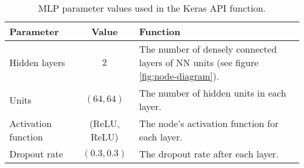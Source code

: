 \begin{table}[!htb]
    \centering
    \caption{\ac{MLP} parameter values used in the Keras API function.}
    \begin{tabular}{>{\raggedright}p{} | c | p{}}
        Parameter                       & Value                     & Function \\ \hline
        Hidden layers                   & $2$                       & The number of densely connected layers of \ac{NN} units (see figure \ref{fig:node-diagram}). \\ \hline
        Units                           & $(64, 64)$     & The number of hidden units in each layer. \\ \hline
        Activation function             & (ReLU, ReLU)              & The node's activation function for each layer.\\ \hline
        Dropout rate                    & $(0.3, 0.3)$   & The dropout rate after each layer. \\ \hline
    \end{tabular}
    \label{tab:mlp-parameters}
\end{table}
